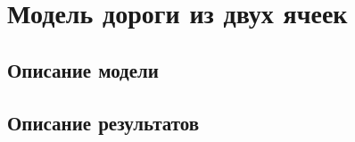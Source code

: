 \section{Модель дороги из двух ячеек}

\subsection{Описание модели}

\subsection{Описание результатов}

\clearpage